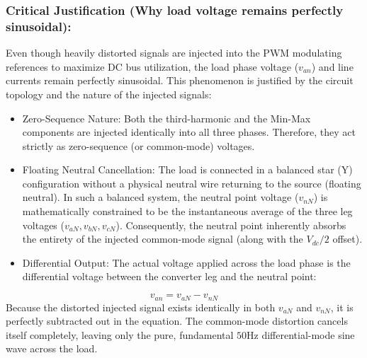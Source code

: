 \documentclass{article}
\begin{document}
\subsubsection{Critical Justification (Why load voltage remains perfectly sinusoidal):}
Even though heavily distorted signals are injected into the PWM modulating references to maximize DC bus utilization, the load phase voltage ($v_{an}$) and line currents remain perfectly sinusoidal. This phenomenon is justified by the circuit topology and the nature of the injected signals:
\begin{itemize}
    \item Zero-Sequence Nature: Both the third-harmonic and the Min-Max components are injected identically into all three phases. Therefore, they act strictly as zero-sequence (or common-mode) voltages.
\end{itemize}
\begin{itemize}
    \item Floating Neutral Cancellation: The load is connected in a balanced star (Y) configuration without a physical neutral wire returning to the source (floating neutral). In such a balanced system, the neutral point voltage ($v_{nN}$) is mathematically constrained to be the instantaneous average of the three leg voltages ($v_{aN}, v_{bN}, v_{cN}$). Consequently, the neutral point inherently absorbs the entirety of the injected common-mode signal (along with the $V_{dc}/2$ offset).
\end{itemize}
\begin{itemize}
    \item Differential Output: The actual voltage applied across the load phase is the differential voltage between the converter leg and the neutral point:
\end{itemize}
$$v_{an} = v_{aN} - v_{nN}$$
Because the distorted injected signal exists identically in both $v_{aN}$ and $v_{nN}$, it is perfectly subtracted out in the equation. The common-mode distortion cancels itself completely, leaving only the pure, fundamental $50\text{Hz}$ differential-mode sine wave across the load.
\end{document}
